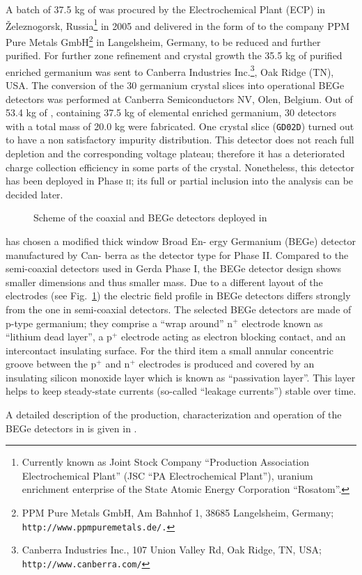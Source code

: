 A batch of 37.5 kg of  was procured by the Electrochemical Plant (ECP) in Železnogorsk, Russia\footnote{Currently known as Joint Stock Company ``Production Association Electrochemical Plant'' (JSC ``PA Electrochemical Plant''), uranium enrichment enterprise of the State Atomic Energy Corporation ``Rosatom''.} in 2005 and delivered in the form of  to the company PPM Pure Metals GmbH\footnote{PPM Pure Metals GmbH, Am Bahnhof 1, 38685 Langelsheim, Germany; \texttt{http://www.ppmpuremetals.de/.}} in Langelsheim, Germany, to be reduced and further purified. For further zone refinement and crystal growth the 35.5 kg of purified enriched germanium was sent to Canberra Industries Inc.\footnote{Canberra Industries Inc., 107 Union Valley Rd, Oak Ridge, TN, USA; \texttt{http://www.canberra.com/}}, Oak Ridge (TN), USA. The conversion of the 30 germanium crystal slices into operational BEGe detectors was performed at Canberra Semiconductors NV, Olen, Belgium. Out of 53.4 kg of  , containing 37.5 kg of elemental enriched germanium, 30 detectors with a total mass of 20.0 kg were fabricated. One crystal slice (\texttt{GD02D}) turned out to have a non satisfactory impurity distribution. This detector does not reach full depletion and the corresponding voltage plateau; therefore it has a deteriorated charge collection efficiency in some parts of the crystal. Nonetheless, this detector has been deployed in {\gerda} Phase \textsc{ii}; its full or partial inclusion into the analysis can be decided later.
\begin{figure}
	\makebox[\textwidth]{%
	}%
	\caption{Scheme of the coaxial and BEGe detectors deployed in {\gerda}}\label{fig:detscheme}
\end{figure}

{\gerda} has chosen a modified thick window Broad En- ergy Germanium (BEGe) detector manufactured by Can- berra as the detector type for Phase II. Compared to the semi-coaxial detectors used in Gerda Phase I, the BEGe detector design shows smaller dimensions and thus smaller mass. Due to a different layout of the electrodes (see Fig.~\ref{fig:detscheme}) the electric field profile in BEGe detectors differs strongly from the one in semi-coaxial detectors. The selected BEGe detectors are made of p-type germanium; they comprise a ``wrap around'' n$^+$ electrode known as ``lithium dead layer'', a p$^+$ electrode acting as electron blocking contact, and an intercontact insulating surface. For the third item a small annular concentric groove between the p$^+$ and n$^+$ electrodes is produced and covered by an insulating silicon monoxide layer which is known as ``passivation layer''. This layer helps to keep steady-state currents (so-called ``leakage currents'') stable over time.

A detailed description of the production, characterization and operation of the BEGe detectors in {\gerda} is given in \cite{detectors}.
